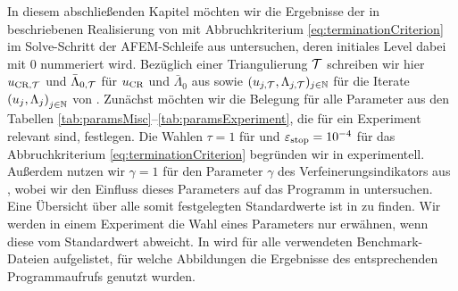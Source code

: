 In diesem abschließenden Kapitel möchten wir die Ergebnisse der in
 beschriebenen Realisierung von
 mit Abbruchkriterium
\eqref{eq:terminationCriterion} im Solve-Schritt der AFEM-Schleife aus
 untersuchen, deren initiales Level dabei mit 0 nummeriert
wird.
Bezüglich einer Triangulierung $\mathcal{T}$ schreiben wir hier $u_{\textup{CR}, \mathcal{T}}$ und
$\bar\Lambda_{0,\mathcal{T}}$ für $u_\textup{CR}$ und $\bar\Lambda_0$ aus
 sowie $(u_{j, \mathcal{T}}, \Lambda_{j,\mathcal{T}})_{j\in\mathbb{N}}$
für die Iterate $\left(u_j, \Lambda_j\right)_{j\in\mathbb{N}}$  von
.
Zunächst möchten wir die Belegung für alle Parameter aus den Tabellen
\ref{tab:paramsMisc}--\ref{tab:paramsExperiment}, die für ein Experiment
relevant sind, festlegen.
Die Wahlen $\tau = 1$ für  und $\varepsilon_{\textup{stop}}
= 10^{-4}$ für das Abbruchkriterium \eqref{eq:terminationCriterion} begründen
wir in  experimentell. 
Außerdem nutzen wir $\gamma = 1$ für den Parameter $\gamma$ des
Verfeinerungsindikators aus , wobei wir den
Einfluss dieses Parameters auf das Programm in
 untersuchen. 
Eine Übersicht über alle somit festgelegten Standardwerte ist in
 zu finden. 
Wir werden in einem Experiment die Wahl eines Parameters nur
erwähnen, wenn diese vom Standardwert abweicht.
In  wird für alle verwendeten Benchmark-Dateien
aufgelistet, für welche Abbildungen die Ergebnisse des entsprechenden
Programmaufrufs genutzt wurden.

